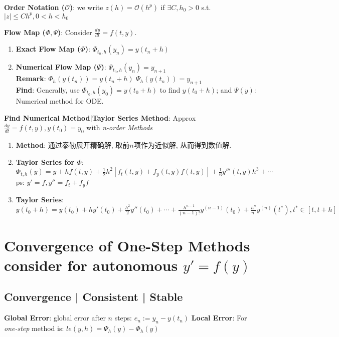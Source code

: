\documentclass[9pt]{article}
\begin{document}
\textbf{Order Notation ($\mathcal{O}$)}: we write $z(h)=\mathcal{O}(h^p)$ if $\exists C,h_0>0$ s.t. $|z|\leq Ch^p,0<h<h_0$

\textbf{Flow Map ($\Phi,\Psi$)}: Consider $\frac{dy}{dt}=f(t,y)$.

\begin{enumerate}[itemsep=-2pt, topsep=-2pt]
    \item \textbf{Exact Flow Map ($\Phi$)}: $\Phi_{t_n,h}(y_n)=y(t_n+h)$ 
    \item \textbf{Numerical Flow Map ($\Psi$)}: $\Psi_{t_n,h}(y_n)=y_{n+1}$  \\
    \textbf{Remark}: $\Phi_h(y(t_n))=y(t_n+h)$ \quad \quad $\Psi_h(y(t_n))=y_{n+1}$ \\
    \textbf{Find}: Generally, use $\Phi_{t_0,h}(y_0)=y(t_0+h)$ to find $y(t_0+h)$; \quad and $\Psi(y)$: Numerical method for ODE.
\end{enumerate}

\textbf{Find Numerical Method|Taylor Series Method}: {\small Approx $\frac{dy}{dt}=f(t,y),y(t_0)=y_0$ with \textit{n-order Methods}}

\begin{enumerate}[itemsep=-2pt, topsep=-2pt]
    \item \textbf{Method}: {\small 通过泰勒展开精确解, 取前$n$项作为近似解, 从而得到数值解.}
    \item \textbf{Taylor Series for $\Phi$}: $\Phi_{t,h}(y)=y+hf(t,y)+\frac{1}{2}h^2[f_t(t,y)+f_y(t,y)f(t,y)]+\frac{1}{6}y'''(t,y)h^3+\cdots$  {\tiny ps: $y'=f,y''=f_t+f_yf$}
    \item \textbf{Taylor Series}: $y(t_0+h)=y(t_0)+hy'(t_0)+\frac{h^2}{2}y''(t_0)+\cdots+\frac{h^{n-1}}{(n-1)!}y^{(n-1)}(t_0)+\frac{h^n}{n!}y^{(n)}(t^*),t^*\in[t,t+h]$
\end{enumerate}


\section{Convergence of One-Step Methods {\scriptsize consider for autonomous $y'=f(y)$}} %

\subsection{Convergence | Consistent | Stable} %
\textbf{Global Error}: global error after $n$ steps: $e_n:=y_n-y(t_n)$ \quad \textbf{Local Error}: {\small For \textit{one-step} method is: $le(y,h)=\Psi_h(y)-\Phi_h(y)$}
\end{document}

